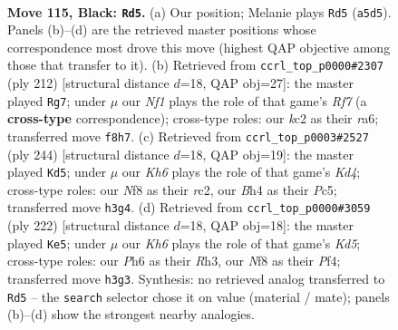 \documentclass[11pt]{article}
\begin{document}
\clearpage

\begin{figure}[p]\centering
\begin{subfigure}{0.46\textwidth}\centering
\resizebox{\linewidth}{!}{%
\newchessgame
\chessboard[
  setfen={5n2/8/1R5p/r3p3/7b/7k/2Kp4/8 b - - 1 115},
  showmover=false,
  pgfstyle=straightmove, color=movearrow, markmove={a5-d5}
]}
\caption{}
\end{subfigure}\hfill
\begin{subfigure}{0.46\textwidth}\centering
\resizebox{\linewidth}{!}{%
\newchessgame
\chessboard[
  setfen={8/P4R2/r7/8/2k5/2P5/1K6/8 w - - 5 107},
  showmover=false,
  pgfstyle=straightmove, color=movearrow, markmove={f7-g7}
]}
\caption{}
\end{subfigure}
\\[4pt]
\begin{subfigure}{0.46\textwidth}\centering
\resizebox{\linewidth}{!}{%
\newchessgame
\chessboard[
  setfen={8/k7/P7/2P5/3K4/R7/2r5/8 w - - 85 123},
  showmover=false,
  pgfstyle=straightmove, color=movearrow, markmove={d4-d5}
]}
\caption{}
\end{subfigure}\hfill
\begin{subfigure}{0.46\textwidth}\centering
\resizebox{\linewidth}{!}{%
\newchessgame
\chessboard[
  setfen={7k/7P/5r2/3K4/5P2/7R/8/8 w - - 27 112},
  showmover=false,
  pgfstyle=straightmove, color=movearrow, markmove={d5-e5}
]}
\caption{}
\end{subfigure}
\caption{\textbf{Move 115, Black: \texttt{Rd5}.} (a) Our position; Melanie plays \texttt{Rd5} (\texttt{a5d5}). Panels (b)--(d) are the retrieved master positions whose correspondence most drove this move (highest QAP objective among those that transfer to it). (b) Retrieved from \texttt{ccrl\_top\_p0000\#2307} (ply 212) [structural distance $d$=18, QAP obj=27]: the master played \texttt{Rg7}; under $\mu$ our \emph{Nf1} plays the role of that game's \emph{Rf7} (a \textbf{cross-type} correspondence); cross-type roles: our \emph{k}c2 as their \emph{r}a6; transferred move \texttt{f8h7}. (c) Retrieved from \texttt{ccrl\_top\_p0003\#2527} (ply 244) [structural distance $d$=18, QAP obj=19]: the master played \texttt{Kd5}; under $\mu$ our \emph{Kh6} plays the role of that game's \emph{Kd4}; cross-type roles: our \emph{N}f8 as their \emph{r}c2, our \emph{B}h4 as their \emph{P}c5; transferred move \texttt{h3g4}. (d) Retrieved from \texttt{ccrl\_top\_p0000\#3059} (ply 222) [structural distance $d$=18, QAP obj=18]: the master played \texttt{Ke5}; under $\mu$ our \emph{Kh6} plays the role of that game's \emph{Kd5}; cross-type roles: our \emph{P}h6 as their \emph{R}h3, our \emph{N}f8 as their \emph{P}f4; transferred move \texttt{h3g3}. Synthesis: no retrieved analog transferred to \texttt{Rd5} -- the \texttt{search} selector chose it on value (material / mate); panels (b)--(d) show the strongest nearby analogies.}
\label{fig:thought-m229}
\end{figure}
\end{document}
